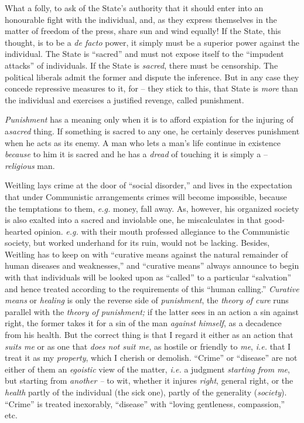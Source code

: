 \documentclass[12pt,a4paper]{book}
\begin{document}
What a folly, to ask of the State's authority that it should enter into an 
honourable fight with the individual, and, as they express themselves in the 
matter of freedom of the press, share sun and wind equally! If the State, this 
thought, is to be a \textit{de facto} power, it simply must be a superior 
power against the individual. The State is ``sacred'' and must not expose 
itself to the ``impudent attacks'' of individuals. If the State is 
\textit{sacred}, there must be censorship. The political liberals admit the 
former and dispute the inference. But in any case they concede repressive 
measures to it, for -- they stick to this, that State is \textit{more} than 
the individual and exercises a justified revenge, called punishment.

\textit{Punishment} has a meaning only when it is to afford expiation for the 
injuring of a\textit{sacred} thing. If something is sacred to any one, he 
certainly deserves punishment when he acts as its enemy. A man who lets a 
man's life continue in existence \textit{because} to him it is sacred and he 
has a \textit{dread} of touching it is simply a -- \textit{religious} man.

Weitling lays crime at the door of ``social disorder,'' and lives in the 
expectation that under Communistic arrangements crimes will become impossible, 
because the temptations to them, \textit{e.g.} money, fall away. As, however, 
his organized society is also exalted into a sacred and inviolable one, he 
miscalculates in that good-hearted opinion. \textit{e.g.} with their mouth 
professed allegiance to the Communistic society, but worked underhand for its 
ruin, would not be lacking. Besides, Weitling has to keep on with ``curative 
means against the natural remainder of human diseases and weaknesses,'' and 
``curative means'' always announce to begin with that individuals will be 
looked upon as ``called'' to a particular ``salvation'' and hence treated 
according to the requirements of this ``human calling.'' \textit{Curative 
means} or \textit{healing} is only the reverse side of \textit{punishment}, 
the \textit{theory of cure} runs parallel with the \textit{theory of 
punishment;} if the latter sees in an action a sin against right, the former 
takes it for a sin of the man \textit{against himself}, as a decadence from 
his health. But the correct thing is that I regard it either as an action that 
\textit{suits me} or as one that \textit{does not suit me}, as hostile or 
friendly to \textit{me}, \textit{i.e.} that I treat it as my 
\textit{property}, which I cherish or demolish. ``Crime'' or ``disease'' 
are not either of them an \textit{egoistic} view of the matter, \textit{i.e.} 
a judgment \textit{starting from me}, but starting from \textit{another --} to 
wit, whether it injures \textit{right}, general right, or the \textit{health} 
partly of the individual (the sick one), partly of the generality 
(\textit{society}). ``Crime'' is treated inexorably, ``disease'' with 
``loving gentleness, compassion,'' etc.
\end{document}
